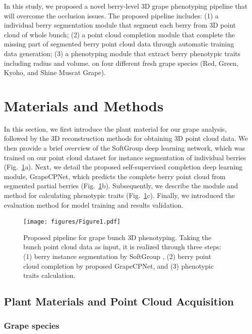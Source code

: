 \documentclass[12pt]{article}
\begin{document}
In this study, we proposed a novel berry-level 3D grape phenotyping pipeline that will overcome the occlusion issues. 
The proposed pipeline includes: 
(1) a individual berry segmentation module that segment each berry from 3D point cloud of whole bunch; 
(2) a point cloud completion module that complete the missing part of segmented berry point cloud data through automatic training data generation; 
(3) a phenotyping module that extract berry phenotypic traits including radius and volume. 
 on four different fresh grape species (Red, Green, Kyoho, and Shine Muscat Grape).

\section{Materials and Methods}

In this section, we first introduce the plant material for our grape analysis, followed by the 3D reconstruction methods for obtaining 3D point cloud data. 
We then provide a brief overview of the SoftGroup \citep{vu_softgroup_2022} deep learning network, which was trained on our point cloud dataset for instance segmentation of individual berries (Fig.~\ref{fig:raw1}a). 
Next, we detail the proposed self-supervised completion deep learning module, GrapeCPNet, which predicts the complete berry point cloud from segmented partial berries (Fig.~\ref{fig:raw1}b). 
Subsequently, we describe the module and method for calculating phenotypic traits (Fig.~\ref{fig:raw1}c). 
Finally, we introduced the evaluation method for model training and results validation.

\begin{figure}[hbt!]
    \centering
    \texttt{[image: figures/Figure1.pdf]}
    \caption{Proposed pipeline for grape bunch 3D phenotyping. Taking the bunch point cloud data as input, it is realized through three steps: (1) berry instance segmentation by SoftGroup \citep{vu_softgroup_2022}, (2) berry point cloud completion by proposed GrapeCPNet, and (3) phenotypic traits calculation.}
    \label{fig:raw1}
\end{figure}

\subsection{Plant Materials and Point Cloud Acquisition}

\subsubsection{Grape species}
\end{document}
